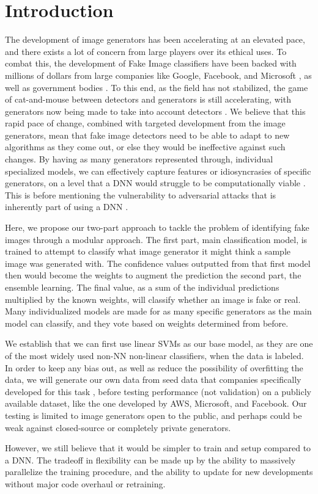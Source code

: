 \documentclass[11pt,twocolumn,letterpaper]{article}
\begin{document}
\section{Introduction}
The development of image generators has been accelerating at an elevated pace, and there exists a lot of concern from large players over its ethical uses. To combat this, the development of Fake Image classifiers have been backed with millions of dollars from large companies like Google, Facebook, and Microsoft \cite{stateOfDeepFakes}, as well as government bodies \cite{stateOfDeepFakes}. To this end, as the field has not stabilized, the game of cat-and-mouse between detectors and generators is still accelerating, with generators now being made to take into account detectors \cite{neekhara2020adversarial}. 
We believe that this rapid pace of change, combined with targeted development from the image generators, mean that fake image detectors need to be able to adapt to new algorithms as they come out, or else they would be ineffective against such changes. By having as many generators represented through, individual specialized models, we can effectively capture features or idiosyncrasies of specific generators, on a level that a DNN would struggle to be computationally viable \cite{sze2017efficient}. This is before mentioning the vulnerability to adversarial attacks that is inherently part of using a DNN \cite{neekhara2020adversarial}. \par
Here, we propose our two-part approach to tackle the problem of identifying fake images through a modular approach. The first part, main classification model, is trained to attempt to classify what image generator it might think a sample image was generated with. The confidence values outputted from that first model then would become the weights to augment the prediction the second part, the ensemble learning. The final value, as a sum of the individual predictions multiplied by the known weights, will classify whether an image is fake or real. Many individualized models are made for as many specific generators as the main model can classify, and they vote based on weights determined from before. \par
We establish that we can first use linear SVMs \cite{10.1145/130385.130401} \cite{10.1023/A:1022627411411} as our base model, as they are one of the most widely used non-NN non-linear classifiers, when the data is labeled. In order to keep any bias out, as well as reduce the possibility of overfitting the data, we will generate our own data from seed data that companies specifically developed for this task \cite{rssler2019faceforensics}, before testing performance (not validation) on a publicly available dataset, like the one developed by AWS, Microsoft, and Facebook. Our testing is limited to image generators open to the public, and perhaps could be weak against closed-source or completely private generators. \par
However, we still believe that it would be simpler to train and setup compared to a DNN. The tradeoff in flexibility can be made up by the ability to massively parallelize the training procedure, and the ability to update for new developments without major code overhaul or retraining. \par
\end{document}
